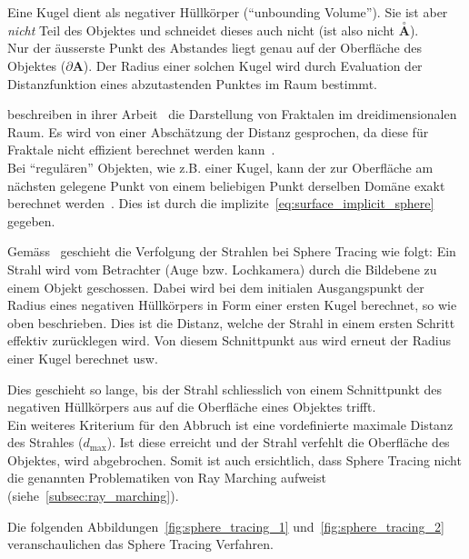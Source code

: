Eine Kugel dient als negativer Hüllkörper (``unbounding Volume''). Sie
ist aber \textit{nicht} Teil des Objektes und schneidet dieses
auch nicht (ist also nicht $\overset{\circ}{\bm{A}}$).\\
Nur der äusserste Punkt des Abstandes  liegt genau
auf der Oberfläche des Objektes ($\partial \bm{A}$). Der Radius einer
solchen Kugel wird durch Evaluation der Distanzfunktion eines
abzutastenden Punktes im Raum bestimmt.

\citeauthor{hart_ray_1989} beschreiben in ihrer
Arbeit~ die Darstellung von Fraktalen im
dreidimensionalen Raum. Es wird von einer Abschätzung der Distanz
gesprochen, da diese für Fraktale nicht effizient berechnet werden
kann~\parencite[S.  291]{hart_ray_1989}.\\
Bei ``regulären'' Objekten, wie z.B. einer Kugel, kann der zur
Oberfläche am nächsten gelegene Punkt von einem beliebigen Punkt
derselben Domäne exakt berechnet werden~\parencite[S.
530]{hart_sphere_1994}. Dies ist durch die
implizite~\autoref{eq:surface_implicit_sphere} gegeben.

Gemäss~\cite[S. 291 - 292]{hart_ray_1989} geschieht die Verfolgung der
Strahlen bei Sphere Tracing wie folgt: Ein Strahl wird vom Betrachter
(Auge bzw.  Lochkamera) durch die Bildebene zu einem Objekt geschossen.
Dabei wird bei dem initialen Ausgangspunkt der Radius eines negativen
Hüllkörpers in Form einer ersten Kugel berechnet, so wie oben beschrieben.
Dies ist die Distanz, welche der Strahl in einem ersten
Schritt effektiv zurücklegen wird. Von diesem Schnittpunkt aus wird
erneut der Radius einer Kugel berechnet usw.

Dies geschieht so lange, bis der Strahl schliesslich von einem
Schnittpunkt des negativen Hüllkörpers aus auf die Oberfläche eines
Objektes trifft.\\
Ein weiteres Kriterium für den Abbruch ist eine vordefinierte maximale
Distanz des Strahles ($d_{\text{max}}$). Ist diese erreicht und der
Strahl verfehlt die Oberfläche des Objektes, wird abgebrochen. Somit ist
auch ersichtlich, dass Sphere Tracing nicht die genannten Problematiken
von Ray Marching aufweist (siehe~\autoref{subsec:ray_marching}).

Die folgenden Abbildungen~\ref{fig:sphere_tracing_1}
und~\ref{fig:sphere_tracing_2} veranschaulichen das Sphere Tracing
Verfahren.

